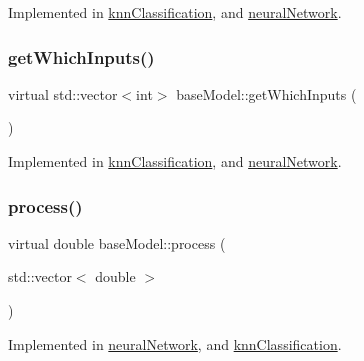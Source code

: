 Implemented in \hyperlink{classknn_classification_a3f9c8fb78c6a66f0ab9440629140400d}{knn\+Classification}, and \hyperlink{classneural_network_aaf9ff8b1a88126fcffc1e9f07a4ffe49}{neural\+Network}.

\mbox{\label{classbase_model_a5d6b7579536f5713eed0b7b4a6687a16}} 
\subsubsection{\texorpdfstring{get\+Which\+Inputs()}{getWhichInputs()}}
{\footnotesize\ttfamily virtual std\+::vector$<$int$>$ base\+Model\+::get\+Which\+Inputs (\begin{DoxyParamCaption}{ }\end{DoxyParamCaption})\hspace{0.3cm}{\ttfamily [pure virtual]}}



Implemented in \hyperlink{classknn_classification_af7db9297f695e67df6af08719da37921}{knn\+Classification}, and \hyperlink{classneural_network_afc93cb28c3897d4d1faa4ac8fbf0c1f8}{neural\+Network}.

\mbox{\label{classbase_model_a07d92b944728ff2b3339d6bceaecb6a3}} 
\subsubsection{\texorpdfstring{process()}{process()}}
{\footnotesize\ttfamily virtual double base\+Model\+::process (\begin{DoxyParamCaption}\item[{std\+::vector$<$ double $>$}]{ }\end{DoxyParamCaption})\hspace{0.3cm}{\ttfamily [pure virtual]}}



Implemented in \hyperlink{classneural_network_a2da76293dbe590594e79e96768c02a29}{neural\+Network}, and \hyperlink{classknn_classification_a909050a125c4bf5cc2e48db0202fcb79}{knn\+Classification}.

\mbox{\label{classbase_model_aed9192d6c0f17a1816a55b077baf2523}} 
